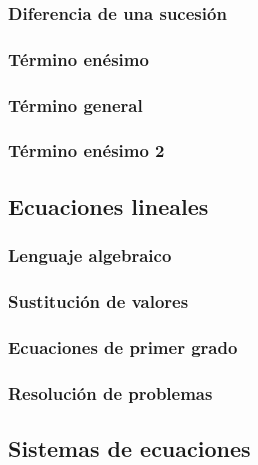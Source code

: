 \documentclass[12pt,addpoints,answers]{evalua}
\begin{document}
\begin{questions}
	\subsubsection{Diferencia de una sucesión}
	\question[1]{}
	\subsubsection{Término enésimo}
	\question[1]{}
	\subsubsection{Término general}
	\question[1]{}
	\subsubsection{Término enésimo 2}
	\question[1]{}
	\subsection   {Ecuaciones lineales}
	\subsubsection{Lenguaje algebraico}
	\question[1]{}
	\subsubsection{Sustitución de valores}
	\question[1]{}
	\subsubsection{Ecuaciones de primer grado}
	\question[1]{}
	\subsubsection{Resolución de problemas}
	\question[1]{}
	\subsection   {Sistemas de ecuaciones}

\end{questions}
\end{document}
